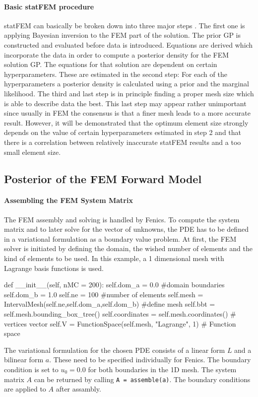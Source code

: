 \documentclass[%
  a4paper,oneside,%
  11pt,%
  smallchapters,
  style=printdev,
  extramargin,
  green,%
  rgb, <cmyk>
  ]{tubsbook}
\begin{document}
\paragraph{Basic statFEM procedure}
statFEM can basically be broken down into three major steps \cite{girolami2021}. The first one is applying Bayesian inversion to the FEM part of the solution. The prior GP is constructed and evaluated before data is introduced. Equations are derived which incorporate the data in order to compute a posterior density for the FEM solution GP. The equations for that solution are dependent on certain hyperparameters. These are estimated in the second step: For each of the hyperparameters a posterior density is calculated using a prior and the marginal likelihood. The third and last step is in principle finding a proper mesh size which is able to describe data the best. This last step may appear rather unimportant since usually in FEM the consensus is that a finer mesh leads to a more accurate result. However, it will be demonstrated that the optimum element size strongly depends on the value of certain hyperparameters estimated in step 2 and that there is a correlation between relatively inaccurate statFEM results and a too small element size.

\subsection{Posterior of the FEM Forward Model}

\paragraph{Assembling the FEM System Matrix}
The FEM assembly and solving is handled by Fenics. To compute the system matrix and to later solve for the vector of unknowns, the PDE has to be defined in a variational formulation as a boundary value problem.
At first, the FEM solver is initiated by defining the domain, the wished number of elements and the kind of elements to be used. In this example, a 1 dimensional mesh with Lagrange basis functions is used.
\begin{python}
def __init__(self, nMC = 200):
	self.dom_a = 0.0 #domain boundaries
	self.dom_b = 1.0
	self.ne	= 100 #number of elements
	self.mesh = IntervalMesh(self.ne,self.dom_a,self.dom_b) #define mesh
	self.bbt = self.mesh.bounding_box_tree()
	self.coordinates = self.mesh.coordinates() # vertices vector
	self.V = FunctionSpace(self.mesh, "Lagrange", 1) # Function space
\end{python}
The variational formulation for the chosen PDE consists of a linear form $L$ and a bilinear form $a$. These need to be specified individually for Fenics. The boundary condition is set to $u_0 = 0.0$ for both boundaries in the 1D mesh. The system matrix $A$ can be returned by calling \texttt{A = assemble(a)}. The boundary conditions are applied to $A$ after assambly.
\end{document}

